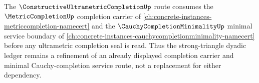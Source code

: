 The $\ConstructiveUltrametricCompletionUp$ route consumes the $\MetricCompletionUp$ completion carrier of \autoref{ch:concrete-instances-metriccompletion-namecert} and the $\CauchyCompletionMinimalityUp$ minimal service boundary of \autoref{ch:concrete-instances-cauchycompletionminimality-namecert} before any ultrametric completion seal is read. Thus the strong-triangle dyadic ledger remains a refinement of an already displayed completion carrier and minimal Cauchy-completion service route, not a replacement for either dependency.
